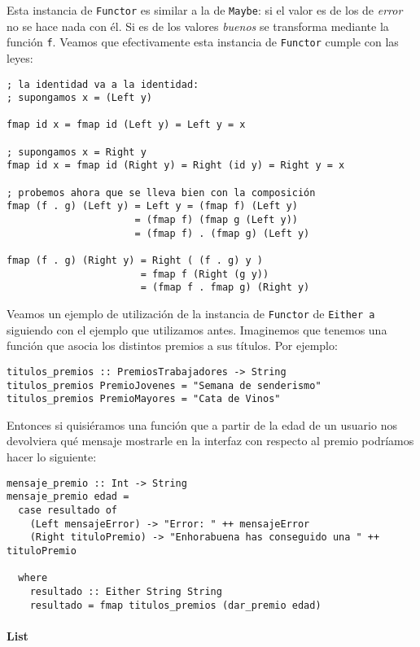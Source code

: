 Esta instancia de \verb~Functor~ es similar a la de \verb~Maybe~: si el valor
es de los de \emph{error} no se hace nada con él. Si es de los valores
\emph{buenos} se transforma mediante la función \verb~f~. Veamos que efectivamente
esta instancia de \verb~Functor~ cumple con las leyes:

\begin{verbatim}
; la identidad va a la identidad:
; supongamos x = (Left y)

fmap id x = fmap id (Left y) = Left y = x

; supongamos x = Right y
fmap id x = fmap id (Right y) = Right (id y) = Right y = x

; probemos ahora que se lleva bien con la composición
fmap (f . g) (Left y) = Left y = (fmap f) (Left y)
                      = (fmap f) (fmap g (Left y))
                      = (fmap f) . (fmap g) (Left y)

fmap (f . g) (Right y) = Right ( (f . g) y )
                       = fmap f (Right (g y))
                       = (fmap f . fmap g) (Right y)
\end{verbatim}

Veamos un ejemplo de utilización de la instancia de \verb~Functor~ de
\verb~Either a~ siguiendo con el ejemplo que utilizamos antes. Imaginemos
que tenemos una función que asocia los distintos premios a sus títulos.
Por ejemplo:

\begin{verbatim}
titulos_premios :: PremiosTrabajadores -> String
titulos_premios PremioJovenes = "Semana de senderismo"
titulos_premios PremioMayores = "Cata de Vinos"
\end{verbatim}

Entonces si quisiéramos una función que a partir de la edad de
un usuario nos devolviera qué mensaje mostrarle en la interfaz
con respecto al premio podríamos hacer lo siguiente:

\begin{verbatim}
mensaje_premio :: Int -> String
mensaje_premio edad =
  case resultado of
    (Left mensajeError) -> "Error: " ++ mensajeError
    (Right tituloPremio) -> "Enhorabuena has conseguido una " ++ tituloPremio

  where
    resultado :: Either String String
    resultado = fmap titulos_premios (dar_premio edad)
\end{verbatim}

\paragraph{List}
